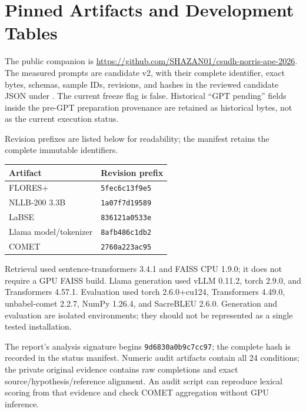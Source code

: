 \section{Pinned Artifacts and Development Tables}
The public companion is \url{https://github.com/SHAZAN01/csudh-norris-ape-2026}. The measured prompts are candidate v2, with their complete identifier, exact bytes, schemas, sample IDs, revisions, and hashes in the reviewed candidate JSON under . The current freeze flag is false. Historical ``GPT pending'' fields inside the pre-GPT preparation provenance are retained as historical bytes, not as the current execution status.

Revision prefixes are listed below for readability; the manifest retains the complete immutable identifiers.
\begin{center}\small
\begin{tabular}{ll}\toprule
Artifact & Revision prefix \\\midrule
FLORES+ & \texttt{5fec6c13f9e5} \\
NLLB-200 3.3B & \texttt{1a07f7d19589} \\
LaBSE & \texttt{836121a0533e} \\
Llama model/tokenizer & \texttt{8afb486c1db2} \\
COMET & \texttt{2760a223ac95} \\\bottomrule
\end{tabular}
\end{center}

Retrieval used sentence-transformers 3.4.1 and FAISS CPU 1.9.0; it does not require a GPU FAISS build. Llama generation used vLLM 0.11.2, torch 2.9.0, and Transformers 4.57.1. Evaluation used torch 2.6.0+cu124, Transformers 4.49.0, unbabel-comet 2.2.7, NumPy 1.26.4, and SacreBLEU 2.6.0. Generation and evaluation are isolated environments; they should not be represented as a single tested installation.

The report's analysis signature begins \texttt{9d6830a0b9c7cc97}; the complete hash is recorded in the status manifest. Numeric audit artifacts contain all 24 conditions; the private original evidence contains raw completions and exact source/hypothesis/reference alignment. An audit script can reproduce lexical scoring from that evidence and check COMET aggregation without GPU inference.
